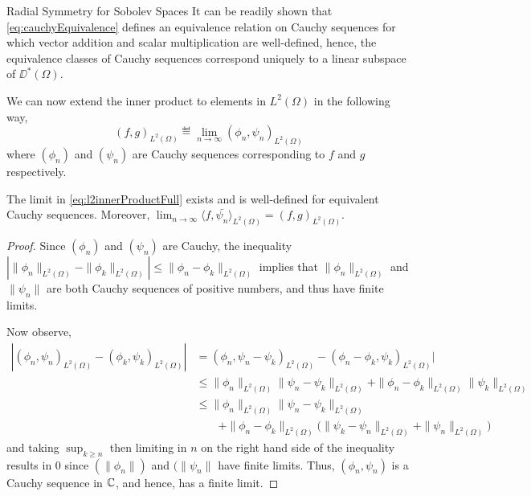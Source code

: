 \begin{chapter}{Radial Symmetry for Sobolev Spaces}
It can be readily shown that \eqref{eq:cauchyEquivalence} defines an equivalence relation on Cauchy sequences for which vector addition and scalar multiplication are well-defined, hence, the equivalence classes of Cauchy sequences correspond uniquely to a linear subspace of $\DD^*(\Omega)$.

We can now extend the inner product to elements in $L^2(\Omega)$ in the following way,
\begin{equation} \label{eq:l2innerProductFull}
  (f,g)_{L^2(\Omega)} \eqdef \lim_{n\to\infty} (\phi_n,\psi_n)_{L^2(\Omega)}
\end{equation}
where $(\phi_n)$ and $(\psi_n)$ are Cauchy sequences corresponding to $f$ and $g$ respectively.
\begin{prop}
  The limit in \eqref{eq:l2innerProductFull} exists and is well-defined for equivalent Cauchy sequences. 
  Moreover, $\lim_{n\to\infty} \langle f,\bar{\psi_n}\rangle _{L^2(\Omega)} = (f,g)_{L^2(\Omega)}$.
\end{prop}
\begin{proof}
  Since $(\phi_n)$ and $(\psi_n)$ are Cauchy, the inequality $|\|\phi_n\|_{L^2(\Omega)} - \|\phi_k\|_{L^2(\Omega)}| \le \|\phi_n - \phi_k\|_{L^2(\Omega)}$ implies that $\|\phi_n\|_{L^2(\Omega)}$ and $\|\psi_n\|$ are both Cauchy sequences of positive numbers, and thus have finite limits.

Now observe,
\begin{align}
  |(\phi_n,\psi_n)_{L^2(\Omega)} - (\phi_k,\psi_k)_{L^2(\Omega)}| 
    &= (\phi_n,\psi_n-\psi_k)_{L^2(\Omega)} -(\phi_n-\phi_k,\psi_k)_{L^2(\Omega)}| \nonumber\\
    &\le \|\phi_n\|_{L^2(\Omega)}\|\psi_n-\psi_k\|_{L^2(\Omega)} + \|\phi_n - \phi_k\|_{L^2(\Omega)}\|\psi_k\|_{L^2(\Omega)} \nonumber\\
    &\le \|\phi_n\|_{L^2(\Omega)}\|\psi_n-\psi_k\|_{L^2(\Omega)} \nonumber\\
    &\quad\quad+ \|\phi_n - \phi_k\|_{L^2(\Omega)}\big(\|\psi_k - \psi_n\|_{L^2(\Omega)} + \|\psi_n\|_{L^2(\Omega)}\big)
\end{align}
and taking $\sup_{k\ge n}$ then limiting in $n$ on the right hand side of the inequality results in 0 since $(\|\phi_n\|)$ and $(\|\psi_n\|$ have finite limits.
Thus, $(\phi_n,\psi_n)$ is a Cauchy sequence in $\mathbb C$, and hence, has a finite limit.


\end{proof}
\end{chapter}
